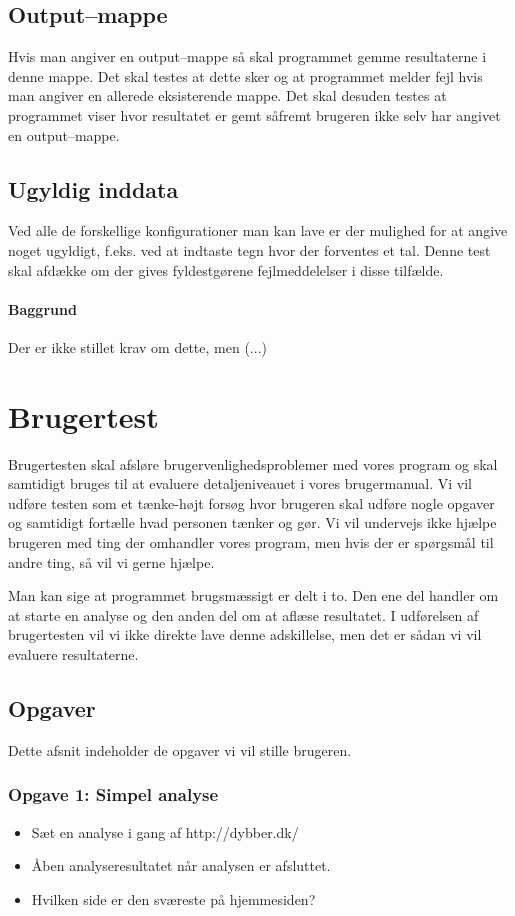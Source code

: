 \documentclass[a4paper,oneside,article]{memoir}
\begin{document}
\section{Output--mappe}
Hvis man angiver en output--mappe så skal programmet gemme
resultaterne i denne mappe. Det skal testes at dette sker og at
programmet melder fejl hvis man angiver en allerede eksisterende
mappe. Det skal desuden testes at programmet viser hvor resultatet er
gemt såfremt brugeren ikke selv har angivet en output--mappe.

\section{Ugyldig inddata}
Ved alle de forskellige konfigurationer man kan lave er der mulighed
for at angive noget ugyldigt, f.eks. ved at indtaste tegn hvor der
forventes et tal. Denne test skal afdække om der gives fyldestgørene
fejlmeddelelser i disse tilfælde.



\subsubsection{Baggrund}
Der er ikke stillet krav om dette, men (...)

\chapter{Brugertest}
Brugertesten skal afsløre brugervenlighedsproblemer med vores program
og skal samtidigt bruges til at evaluere detaljeniveauet i vores
brugermanual. Vi vil udføre testen som et tænke-højt forsøg hvor
brugeren skal udføre nogle opgaver og samtidigt fortælle hvad personen
tænker og gør. Vi vil undervejs ikke hjælpe brugeren med ting der
omhandler vores program, men hvis der er spørgsmål til andre ting, så
vil vi gerne hjælpe.

Man kan sige at programmet brugsmæssigt er delt i to. Den ene del
handler om at starte en analyse og den anden del om at aflæse
resultatet. I udførelsen af brugertesten vil vi ikke direkte lave
denne adskillelse, men det er sådan vi vil evaluere resultaterne.

\section{Opgaver}
Dette afsnit indeholder de opgaver vi vil stille brugeren.

\subsection{Opgave 1: Simpel analyse}
\begin{itemize}
\item Sæt en analyse i gang af http://dybber.dk/
\item Åben analyseresultatet når analysen er afsluttet.
\item Hvilken side er den sværeste på hjemmesiden?
\end{itemize}
\end{document}
